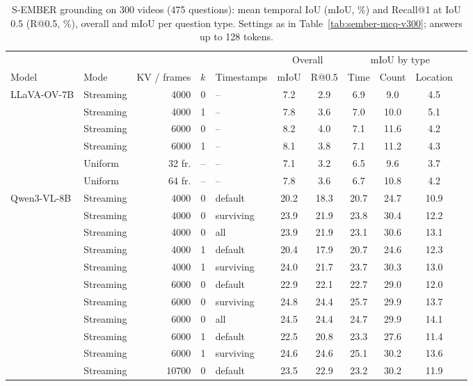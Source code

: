 \begin{table}[t]
\centering
\small
\caption{S-EMBER grounding on 300 videos (475 questions): mean temporal IoU (mIoU, \%) and Recall@1 at IoU 0.5 (R@0.5, \%), overall and mIoU per question type. Settings as in Table~\ref{tab:sember-mcq-v300}; answers up to 128 tokens.}
\label{tab:sember-grounding-v300}
\begin{tabular}{llrclcccccc}
\toprule
& & & & & \multicolumn{2}{c}{Overall} & \multicolumn{3}{c}{mIoU by type} \\
\cmidrule(lr){6-7}\cmidrule(lr){8-10}
Model & Mode & KV / frames & $k$ & Timestamps & mIoU & R@0.5 & Time & Count & Location \\
\midrule
\multirow{6}{*}{LLaVA-OV-7B} & Streaming & 4000 & 0 & -- & 7.2 & 2.9 & 6.9 & 9.0 & 4.5 \\
 & Streaming & 4000 & 1 & -- & 7.8 & 3.6 & 7.0 & 10.0 & 5.1 \\
 & Streaming & 6000 & 0 & -- & 8.2 & 4.0 & 7.1 & 11.6 & 4.2 \\
 & Streaming & 6000 & 1 & -- & 8.1 & 3.8 & 7.1 & 11.2 & 4.3 \\
 & Uniform & 32 fr. & -- & -- & 7.1 & 3.2 & 6.5 & 9.6 & 3.7 \\
 & Uniform & 64 fr. & -- & -- & 7.8 & 3.6 & 6.7 & 10.8 & 4.2 \\
\midrule
\multirow{18}{*}{Qwen3-VL-8B} & Streaming & 4000 & 0 & default & 20.2 & 18.3 & 20.7 & 24.7 & 10.9 \\
 & Streaming & 4000 & 0 & surviving & 23.9 & 21.9 & 23.8 & 30.4 & 12.2 \\
 & Streaming & 4000 & 0 & all & 23.9 & 21.9 & 23.1 & 30.6 & 13.1 \\
 & Streaming & 4000 & 1 & default & 20.4 & 17.9 & 20.7 & 24.6 & 12.3 \\
 & Streaming & 4000 & 1 & surviving & 24.0 & 21.7 & 23.7 & 30.3 & 13.0 \\
 & Streaming & 6000 & 0 & default & 22.9 & 22.1 & 22.7 & 29.0 & 12.0 \\
 & Streaming & 6000 & 0 & surviving & 24.8 & 24.4 & 25.7 & 29.9 & 13.7 \\
 & Streaming & 6000 & 0 & all & 24.5 & 24.4 & 24.7 & 29.9 & 14.1 \\
 & Streaming & 6000 & 1 & default & 22.5 & 20.8 & 23.3 & 27.6 & 11.4 \\
 & Streaming & 6000 & 1 & surviving & 24.6 & 24.6 & 25.1 & 30.2 & 13.6 \\
 & Streaming & 10700 & 0 & default & 23.5 & 22.9 & 23.2 & 30.2 & 11.9 \\

\end{tabular}
\end{table}

